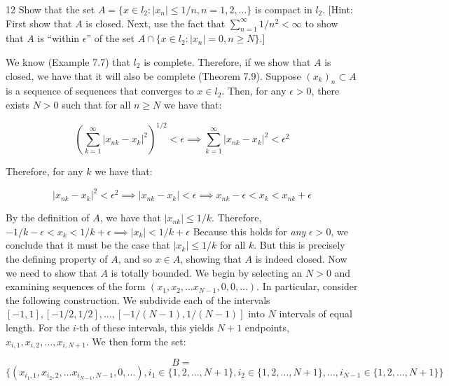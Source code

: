 \begin{exercise}{12}
    Show that the set $A = \{x \in l_2: \lvert x_n \rvert \leq 1/n, n = 1, 2, \ldots\}$ is compact in $l_2$.
    [Hint: First show that $A$ is closed.
    Next, use the fact that $\sum_{n=1}^{\infty} 1/n^2 < \infty$ to show that $A$ is ``within $\epsilon$'' of the set $A \cap \{x \in l_2: \lvert x_n \rvert = 0, n \geq N\}$.]
\end{exercise}

\begin{solution}
    
    We know (Example 7.7) that $l_2$ is complete.
    Therefore, if we show that $A$ is closed, we have that it will also be complete (Theorem 7.9).
    Suppose $(x_k)_n \subset A$ is a sequence of sequences that converges to $x \in l_2$.
    Then, for any $\epsilon > 0$, there exists $N > 0$ such that for all $n \geq N$ we have that:

    \[(\sum_{k=1}^{\infty} \lvert x_{nk} - x_k \rvert^2)^{1/2} < \epsilon \implies \sum_{k=1}^{\infty} \lvert x_{nk} - x_k \rvert^2 < \epsilon^2\]

    Therefore, for any $k$ we have that:
    
    \[\lvert x_{nk} - x_k \rvert^2 < \epsilon^2 \implies \lvert x_{nk} - x_k \rvert < \epsilon \implies x_{nk} - \epsilon < x_k < x_{nk} + \epsilon\]

    By the definition of $A$, we have that $\lvert x_{nk} \rvert \leq 1/k$.
    Therefore, $-1/k - \epsilon < x_k < 1/k + \epsilon \implies \lvert x_k \rvert < 1/k + \epsilon$
    Because this holds for \textit{any} $\epsilon > 0$, we conclude that it must be the case that $\lvert x_k \rvert \leq 1/k$ for all $k$.
    But this is precisely the defining property of $A$, and so $x \in A$, showing that $A$ is indeed closed.
    Now we need to show that $A$ is totally bounded.
    We begin by selecting an $N > 0$ and examining sequences of the form $(x_1, x_2, \ldots x_{N - 1}, 0 , 0, \ldots)$.
    In particular, consider the following construction.
    We subdivide each of the intervals $[-1, 1], [-1/2, 1/2], \ldots, [-1/(N - 1), 1/(N - 1)]$ into $N$ intervals of equal length.
    For the $i$-th of these intervals, this yields $N + 1$ endpoints, $x_{i, 1}, x_{i, 2}, \ldots, x_{i, N + 1}$.
    We then form the set:
    
    \[B = \]
    \[\{(x_{i_1, 1}, x_{i_2, 2}, \ldots x_{i_{N-1}, N-1}, 0, \ldots), i_1 \in \{1, 2, \ldots, N + 1\}, i_2 \in \{1, 2, \ldots, N + 1\}, \ldots, i_{N-1} \in \{1, 2, \ldots, N + 1\}\}\]


\end{solution}
